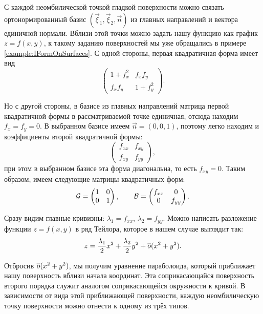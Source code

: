 С каждой неомбилической точкой гладкой поверхности можно связать ортонормированный базис $(\vec{\xi}_1, \vec{\xi}_2, \vec{n})$ из главных направлений и вектора единичной нормали. Вблизи этой точки можно задать нашу функцию как график $z = f(x, y)$, к такому заданию поверхностей мы уже обращались в примере \ref{example:IFormOnSurfaces}. С одной стороны, первая квадратичная форма имеет вид
\[
	\begin{pmatrix}
		1 + f_x^2 & f_xf_y\\
		f_xf_y & 1 + f_y^2
	\end{pmatrix}.
\]

Но с другой стороны, в базисе из главных направлений матрица первой квадратичной формы в рассматриваемой точке единичная, отсюда находим $f_x = f_y = 0$. В выбранном базисе имеем $\vec{n} = (0, 0, 1)$, поэтому легко находим и коэффициенты второй квадратичной формы:
\[
	\begin{pmatrix}
		f_{xx} & f_{xy}\\
		f_{xy} & f_{yy}
	\end{pmatrix},
\]
при этом в выбранном базисе эта форма диагональна, то есть $f_{xy} = 0$. Таким образом, имеем следующие матрицы квадратичных форм:
\[
	\mathcal{G} =
	\begin{pmatrix}
		1 & 0\\
		0 & 1
	\end{pmatrix},\qquad
	\mathcal{B} =
	\begin{pmatrix}
		f_{xx} & 0\\
		0 & f_{yy}
	\end{pmatrix}.
\]

Сразу видим главные кривизны: $\lambda_1 = f_{xx}$, $\lambda_2 = f_{yy}$. Можно написать разложение функции $z = f(x, y)$ в ряд Тейлора, которое в нашем случае выглядит так:
\begin{equation} \label{eq:TailorII}
	z = \frac{\lambda_1}{2}x^2 + \frac{\lambda_2}{2}y^2 + \overline{o}(x^2 + y^2).
\end{equation}

Отбросив $\overline{o}(x^2 + y^2)$, мы получим уравнение параболоида, который приближает нашу поверхность вблизи начала координат. Эта соприкасающайся поверхность второго порядка служит аналогом соприкасающейся окружности к кривой. В зависимости от вида этой приближающей поверхности, каждую неомбилическую точку поверхности можно отнести к одному из трёх типов.

